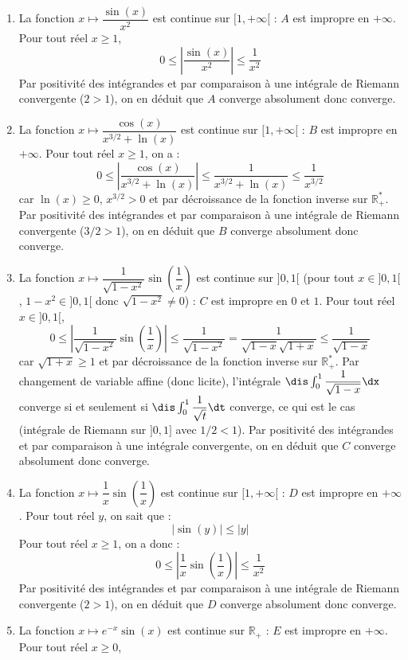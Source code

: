 \documentclass[a4paper,10pt]{report}
\begin{document}
\begin{enumerate}
\item La fonction $x \mapsto  \dfrac{\sin(x)}{x^2}$ est continue sur $[1, + \infty[$ : $A$ est impropre en $+ \infty$. Pour tout réel $x \geq 1$,
$$ 0 \leq \left\vert  \dfrac{\sin(x)}{x^2} \right\vert \leq \dfrac{1}{x^2}$$
Par positivité des intégrandes et par comparaison à une intégrale de Riemann convergente ($2>1$), on en déduit que $A$ converge absolument donc converge.
\item La fonction $x \mapsto  \dfrac{\cos(x)}{x^{3/2}+\ln(x)} $ est continue sur $[1, + \infty[$ : $B$ est impropre en $+ \infty$. Pour tout réel $x \geq 1$, on a :
$$ 0 \leq \left\vert \dfrac{\cos(x)}{x^{3/2}+\ln(x)} \right\vert \leq  \dfrac{1}{x^{3/2}+\ln(x)} \leq \dfrac{1}{x^{3/2}}$$
car $\ln(x) \geq 0$, $x^{3/2}>0$ et par décroissance de la fonction inverse sur $\mathbb{R}_+^{*}$. Par positivité des intégrandes et par comparaison à une intégrale de Riemann convergente ($3/2>1$), on en déduit que $B$ converge absolument donc converge.
\item La fonction $x \mapsto \dfrac{1}{\sqrt{1-x^2}} \sin \left(\dfrac{1}{x}\right) $ est continue sur $]0,1[$ (pour tout $x \in ]0,1[$, $1-x^2 \in ]0,1[$ donc $\sqrt{1-x^2} \neq 0$) : $C$ est impropre en $0$ et $1$. Pour tout réel $x \in ]0,1[$,
$$ 0 \leq \left\vert  \dfrac{1}{\sqrt{1-x^2}} \sin \left(\dfrac{1}{x}\right) \right\vert \leq \dfrac{1}{\sqrt{1-x^2}} = \dfrac{1}{\sqrt{1-x}\sqrt{1+x}} \leq \dfrac{1}{\sqrt{1-x}}$$
car $\sqrt{1+x} \geq 1$ et par décroissance de la fonction inverse sur $\mathbb{R}_+^*$. Par changement de variable affine (donc licite), l'intégrale $\dis \int_0^1 \dfrac{1}{\sqrt{1-x}} \dx$ converge si et seulement si $\dis \int_0^1 \dfrac{1}{\sqrt{t}} \dt$ converge, ce qui est le cas (intégrale de Riemann sur $]0,1]$ avec $1/2<1$). Par positivité des intégrandes et par comparaison à une intégrale convergente, on en déduit que $C$ converge absolument donc converge.
\item La fonction $x \mapsto \dfrac{1}{x} \sin \left(\dfrac{1}{x}\right)$ est continue sur $[1, + \infty[$ : $D$ est impropre en $+ \infty$. Pour tout réel $y$, on sait que :
$$ \vert \sin(y) \vert \leq \vert y \vert$$
Pour tout réel $x \geq 1$, on a donc :
$$ 0 \leq \left\vert \dfrac{1}{x} \sin \left(\dfrac{1}{x}\right) \right\vert \leq \dfrac{1}{x^2}$$
Par positivité des intégrandes et par comparaison à une intégrale de Riemann convergente ($2>1$), on en déduit que $D$ converge absolument donc converge.
\item La fonction $x \mapsto e^{-x} \sin(x)$ est continue sur $\mathbb{R}_+$ : $E$ est impropre en $+ \infty$. Pour tout réel $x \geq 0$,

\end{enumerate}
\end{document}
